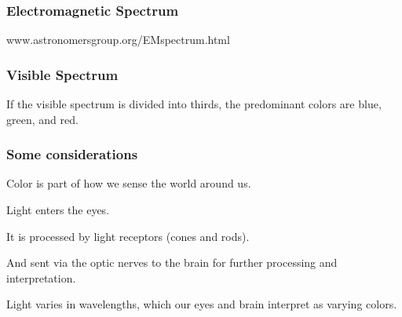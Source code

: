 \documentclass[12pt]{beamer}\usepackage[]{graphicx}\usepackage[]{color}
\begin{document}

\begin{frame}
\frametitle{Electromagnetic Spectrum}
\begin{center}

{\lolit www.astronomersgroup.org/EMspectrum.html}
\end{center}
\end{frame}


\begin{frame}
\frametitle{Visible Spectrum}
\begin{center}

If the visible spectrum is divided into thirds, the predominant colors are blue, green, and red.
\end{center}
\end{frame}


\begin{frame}
\frametitle{Some considerations}

\bbi
  \item Color is part of how we sense the world around us.
  \item Light enters the eyes.
  \item It is processed by light receptors (cones and rods).
  \item And sent via the optic nerves to the brain for further processing and
  interpretation.
  \item Light varies in wavelengths, which our eyes and brain interpret as
  varying colors.
\ei

\end{frame}
  

\begin{frame}
\frametitle{}
\begin{center}
\end{center}
\end{frame}


\begin{frame}
\begin{center}
\Huge{}
\end{center}
\end{frame}
\end{document}
